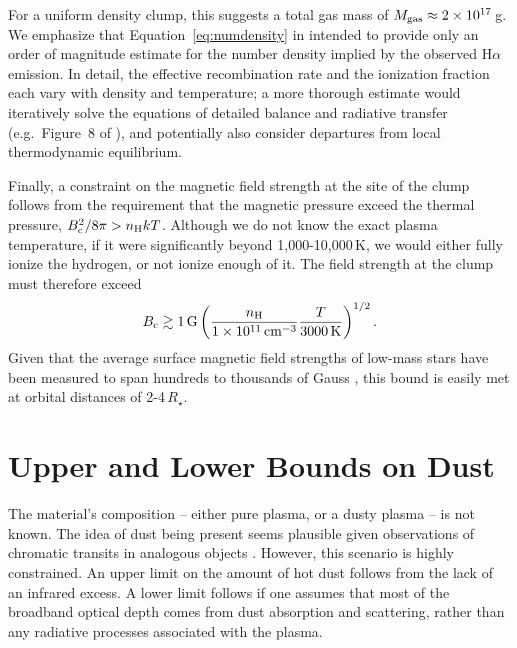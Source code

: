 \documentclass[11pt,twocolumn,tighten]{aastex7}
\begin{document}
For a uniform density clump, this suggests a total gas mass of $M_{\rm
gas}\approx 2\times10^{17}$\,g.  We emphasize that
Equation~\ref{eq:numdensity} in intended to provide only an order of
magnitude estimate for the number density implied by the observed
H$\alpha$ emission.  In detail, the effective recombination rate and
the ionization fraction each vary with density and temperature; a more
thorough estimate would iteratively solve the equations of detailed
balance and radiative transfer (e.g.~Figure~8 of \citealt{CollierCameron1989}),
and potentially also consider departures from local thermodynamic equilibrium.

Finally, a constraint on the magnetic field strength at the site of
the clump follows from the requirement that the magnetic pressure
exceed the thermal pressure, $B_{\rm c}^2 / 8\pi > n_{\rm H} k T$.
Although we do not know the exact plasma temperature, if it were
significantly beyond 1,000-10,000\,K, we would either fully ionize the
hydrogen, or not ionize enough of it.  The field strength at the clump
must therefore exceed
\begin{equation}
  B_{\rm c} \gtrsim 1\,{\rm G}
  \left(
  \frac{n_{\rm H}}{1\times10^{11}\,{\rm cm}^{-3}}
  \frac{T}{3000\,{\rm K}}
  \right)^{1/2}.
\end{equation}
Given that the average surface magnetic field strengths of low-mass
stars have been measured to span hundreds to thousands of Gauss
\citep{Donati2009,Kochukhov2021,Reiners2022}, this bound is easily met
at orbital distances of 2-4\,$R_\star$.

\section{Upper and Lower Bounds on Dust}
\label{subsec:dust}

The material's composition -- either pure plasma, or a dusty plasma --
is not known.  The idea of dust being present seems plausible given
observations of chromatic transits in analogous objects
\citep{Tanimoto2020,Gunther2022,Koen2023}.  However, this scenario is
highly constrained.  An upper limit on the amount of hot dust follows
from the lack of an infrared excess.  A lower limit follows if one
assumes that most of the broadband optical depth comes from dust
absorption and scattering, rather than any radiative processes
associated with the plasma.
\end{document}
